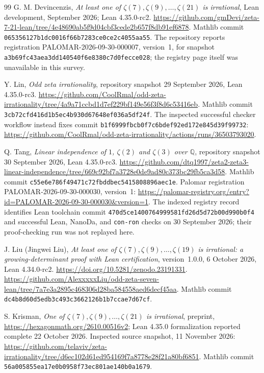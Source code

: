 \documentclass[11pt,letterpaper]{article}
\theoremstyle{definition}
\newcommand{\Q}{\mathbb Q}
\begin{document}
\begin{thebibliography}{99}
G. M. Devincenzis, \emph{At least one of
$\zeta(7),\zeta(9),\ldots,\zeta(21)$ is irrational}, Lean development,
September 2026; Lean 4.35.0-rc2.
\url{https://github.com/gmDevi/zeta-7-21-lean/tree/4e48690ab5f9d04cbf3cede2b657f8db91ef6878}.
Mathlib commit \texttt{065356127b1dc0016f66b7283ce0ce2c4055aa55}.
The repository reports registration PALOMAR-2026-09-30-000007, version~1,
for snapshot \texttt{a3b69fc43aea3dd140540f6e8380c7d0fecce028}; the
registry page itself was unavailable in this survey.

Y. Lin, \emph{Odd zeta irrationality}, repository snapshot
29 September 2026, Lean 4.35.0-rc3.
\url{https://github.com/CoolRmal/odd-zeta-irrationality/tree/4a9a71ccbd1d7ef229bf149e56f3f8d6c53416eb}.
Mathlib commit \texttt{3cb72cfd416d1b5ec4b930d67648ef036a5df24f}.
The inspected successful checker workflow instead fixes commit
\texttt{b1f6999fbcb0f7c6bdef92ed172e845d39f99732}:
\url{https://github.com/CoolRmal/odd-zeta-irrationality/actions/runs/36503793020}.

Q. Tang, \emph{Linear independence of $1$, $\zeta(2)$ and $\zeta(3)$
over $\Q$}, repository snapshot 30 September 2026, Lean 4.35.0-rc3.
\url{https://github.com/dtq1997/zeta2-zeta3-linear-independence/tree/669c92bf7a3728e0de9ad80c373bc29fb5ca3d58}.
Mathlib commit \texttt{c55e6e786f49471c72fbddbec5415808896aec1e}.
Palomar registration PALOMAR-2026-09-30-000030, version~1:
\url{https://palomar-registry.org/entry?id=PALOMAR-2026-09-30-000030&version=1}.
The indexed registry record identifies Lean toolchain commit
\texttt{470d5ce1400764999581fd26d5d72b00d990b0f4} and successful
Lean, NanoDa, and \texttt{con-ron} checks on 30 September 2026;
their proof-checking run was not replayed here.

J. Liu (Jingwei Liu), \emph{At least one of
$\zeta(7),\zeta(9),\ldots,\zeta(19)$ is irrational: a growing-determinant
proof with Lean certification}, version~1.0.0, 6 October 2026,
Lean 4.34.0-rc2. \url{https://doi.org/10.5281/zenodo.23191331}.
\url{https://github.com/AlexxxxxLiu/odd-zeta-seven-lean/tree/7a7e3a2895c468306d28ba584558aed6decf45aa}.
Mathlib commit \texttt{dc4b8d60d5edb3c493c3662126b1b7ccae7d67cf}.

S. Krisman, \emph{One of $\zeta(7),\zeta(9),\ldots,\zeta(21)$ is
irrational}, preprint, \url{https://hexagonmath.org/2610.00516v2};
Lean 4.35.0 formalization reported complete 22 October 2026.
Inspected source snapshot, 11 November 2026:
\url{https://github.com/telaviv/zeta-irrationality/tree/d6ec102d61ed954169f7a8778e28f21a80bf6851}.
Mathlib commit \texttt{56a005855ea17e0b0958f73ec801ae140b0a1679}.


\end{thebibliography}
\end{document}
